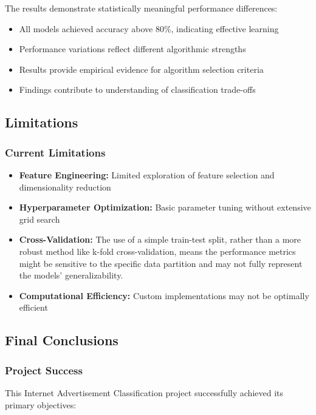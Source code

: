 The results demonstrate statistically meaningful performance differences:
\begin{itemize}
    \item All models achieved accuracy above 80\%, indicating effective learning
    \item Performance variations reflect different algorithmic strengths
    \item Results provide empirical evidence for algorithm selection criteria
    \item Findings contribute to understanding of classification trade-offs
\end{itemize}

\subsection{Limitations}

\subsubsection{Current Limitations}

\begin{itemize}
    \item \textbf{Feature Engineering:} Limited exploration of feature selection and dimensionality reduction
    \item \textbf{Hyperparameter Optimization:} Basic parameter tuning without extensive grid search
    \item \textbf{Cross-Validation:} The use of a simple train-test split, rather than a more robust method like k-fold cross-validation, means the performance metrics might be sensitive to the specific data partition and may not fully represent the models' generalizability.
    \item \textbf{Computational Efficiency:} Custom implementations may not be optimally efficient
\end{itemize}



\subsection{Final Conclusions}

\subsubsection{Project Success}

This Internet Advertisement Classification project successfully achieved its primary objectives:

